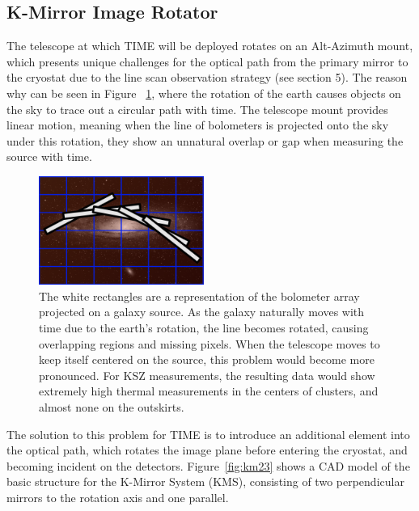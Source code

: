 \documentclass[manuscript]{aastex}
\begin{document}
\subsection{\textbf{K-Mirror Image Rotator}}
The telescope at which TIME will be deployed rotates on an Alt-Azimuth mount, which presents unique challenges for the optical path from the primary mirror to the cryostat due to the line scan observation strategy (see section 5). The reason why can be seen in Figure ~\ref{fig:km1}, where the rotation of the earth causes objects on the sky to trace out a circular path with time. The telescope mount provides linear motion, meaning when the line of bolometers is projected onto the sky under this rotation, they show an unnatural overlap or gap when measuring the source with time.
\begin{figure}
\vspace{-0.8cm}
  \begin{center}
    \includegraphics[width=0.48\textwidth]{km1.png}
  \end{center}
  \caption[Diagram of Bolometer De-rotation on Source from Alt-Az Mount.]{The white rectangles are a representation of the bolometer array projected on a galaxy source. As the galaxy naturally moves with time due to the earth's rotation, the line becomes rotated, causing overlapping regions and missing pixels. When the telescope moves to keep itself centered on the source, this problem would become more pronounced. For KSZ measurements, the resulting data would show extremely high thermal measurements in the centers of clusters, and almost none on the outskirts.}
  \label{fig:km1}
\end{figure}
The solution to this problem for TIME is to introduce an additional element into the optical path, which rotates the image plane before entering the cryostat, and becoming incident on the detectors. Figure~\ref{fig:km23} shows a CAD model of the basic structure for the K-Mirror System (KMS), consisting of two perpendicular mirrors to the rotation axis and one parallel.
\end{document}
